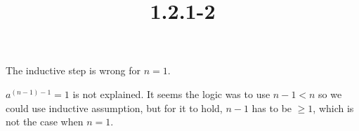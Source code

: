 \documentclass{article}
\title{1.2.1-2}
\begin{document}
\maketitle

The inductive step is wrong for \( n = 1 \).

\( a^{(n-1)-1} = 1 \) is not explained. It seems the logic was to use \( n - 1 < n \) so we could use inductive assumption, but for it to hold, \( n - 1 \) has to be \( \geq 1 \), which is not the case when \( n = 1 \).
\end{document}
